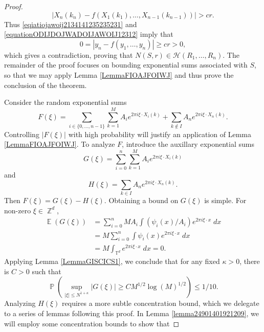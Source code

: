 \documentclass[dvipsnames,letterpaper,12pt]{article}
\numberwithin{equation}{section}
\DeclareMathOperator{\ZZ}{\mathbb{Z}}
\DeclareMathOperator{\TT}{\mathbb{T}}
\numberwithin{theorem}{section}
\DeclareMathOperator{\EE}{\mathbb{E}}
\DeclareMathOperator{\PP}{\mathbb{P}}
\begin{document}
\begin{proof}
    \begin{equation} \label{equationODIJDOJWADOIJAWOIJ12312}
        |X_n(k_n) - f(X_1(k_1),\dots,X_{n-1}(k_{n-1}))| > cr.
    \end{equation}
    Thus \eqref{eqiatiojawoij2134141235235231} and \eqref{equationODIJDOJWADOIJAWOIJ12312} imply that
    \begin{equation}
        0 = |y_n - f(y_1,\dots,y_n)| \geq cr > 0,
    \end{equation}
    which gives a contradiction, proving that $N(S,r) \in \mathcal{H}(R_1,\dots,R_n)$. The remainder of the proof focuses on bounding exponential sums associated with $S$, so that we may apply Lemma \ref{LemmaFIOAJFOIWJ} and thus prove the conclusion of the theorem.

    Consider the random exponential sums
    \[ F(\xi) = \sum_{i \in \{ 0, \dots, n-1 \}} \sum_{k = 1}^M A_i e^{2 \pi i \xi \cdot X_i(k)} + \sum_{k \not \in I} A_n e^{2 \pi i \xi \cdot X_n(k)}. \]
    Controlling $|F(\xi)|$ with high probability will justify an application of Lemma \ref{LemmaFIOAJFOIWJ}. To analyze $F$, introduce the auxillary exponential sums
    \[ G(\xi) = \sum_{i = 0}^n \sum_{k = 1}^M A_i e^{2 \pi i \xi \cdot X_i(k)} \]
    and
    \[ H(\xi) = \sum_{k \in I} A_n e^{2 \pi i \xi \cdot X_n(k)}. \]
    Then $F(\xi) = G(\xi) - H(\xi)$.
    Obtaining a bound on $G(\xi)$ is simple. For non-zero $\xi \in \ZZ^d$,
    \begin{equation}
    \begin{split}
        \EE(G(\xi)) &= \sum_{i = 0}^n M A_i \int (\psi_i(x) / A_i) e^{2 \pi i \xi \cdot x}\; dx\\
        &= M \sum_{i = 0}^n \int \psi_i(x) e^{2 \pi i \xi \cdot x}\; dx\\
        &= M \int_{\TT^d} e^{2 \pi i \xi \cdot x}\; dx = 0.
    \end{split}
    \end{equation}
    Applying Lemma \ref{LemmaGISCICS1}, we conclude that for any fixed $\kappa > 0$, there is $C > 0$ such that
    \begin{equation} \label{equationCOIACOIAJCPPPPP}
        \PP \left( \sup_{|\xi| \leq N^{1 + \kappa}} |G(\xi)| \geq C M^{1/2} \log(M)^{1/2} \right) \leq 1/10.
    \end{equation}
    Analyzing $H(\xi)$ requires a more subtle concentration bound, which we delegate to a series of lemmas following this proof. In Lemma \ref{lemma24901401921209}, we will employ some concentration bounds to show that

\end{proof}
\end{document}
